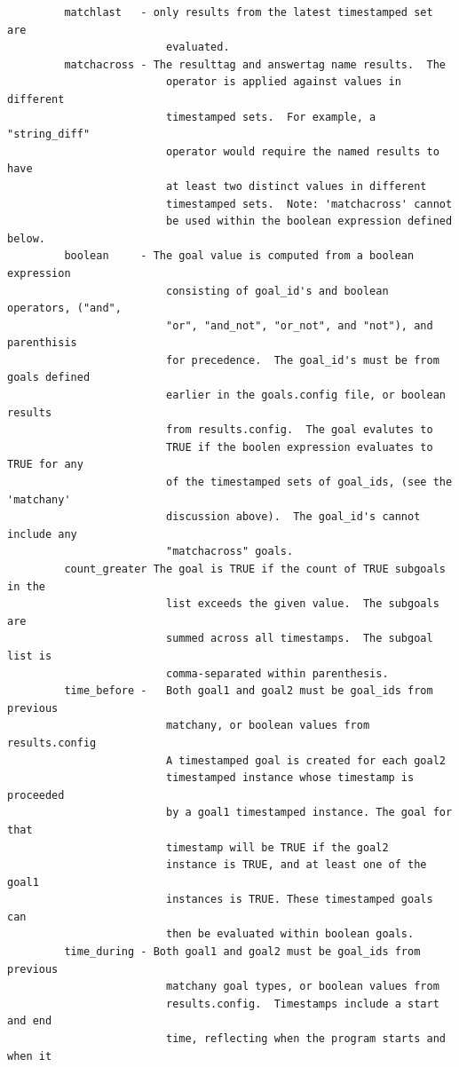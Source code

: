 \documentclass[12pt]{article}
\begin{document}
\begin{verbatim}
         matchlast   - only results from the latest timestamped set are 
                         evaluated.
         matchacross - The resulttag and answertag name results.  The 
                         operator is applied against values in different 
                         timestamped sets.  For example, a "string_diff" 
                         operator would require the named results to have 
                         at least two distinct values in different 
                         timestamped sets.  Note: 'matchacross' cannot 
                         be used within the boolean expression defined below.
         boolean     - The goal value is computed from a boolean expression 
                         consisting of goal_id's and boolean operators, ("and", 
                         "or", "and_not", "or_not", and "not"), and parenthisis 
                         for precedence.  The goal_id's must be from goals defined 
                         earlier in the goals.config file, or boolean results
                         from results.config.  The goal evalutes to 
                         TRUE if the boolen expression evaluates to TRUE for any
                         of the timestamped sets of goal_ids, (see the 'matchany' 
                         discussion above).  The goal_id's cannot include any 
                         "matchacross" goals.
         count_greater The goal is TRUE if the count of TRUE subgoals in the 
                         list exceeds the given value.  The subgoals are 
                         summed across all timestamps.  The subgoal list is 
                         comma-separated within parenthesis.
         time_before -   Both goal1 and goal2 must be goal_ids from previous 
                         matchany, or boolean values from results.config
                         A timestamped goal is created for each goal2 
                         timestamped instance whose timestamp is proceeded 
                         by a goal1 timestamped instance. The goal for that
                         timestamp will be TRUE if the goal2
                         instance is TRUE, and at least one of the goal1
                         instances is TRUE. These timestamped goals can
                         then be evaluated within boolean goals.
         time_during - Both goal1 and goal2 must be goal_ids from previous 
                         matchany goal types, or boolean values from 
                         results.config.  Timestamps include a start and end 
                         time, reflecting when the program starts and when it 

\end{verbatim}
\end{document}
